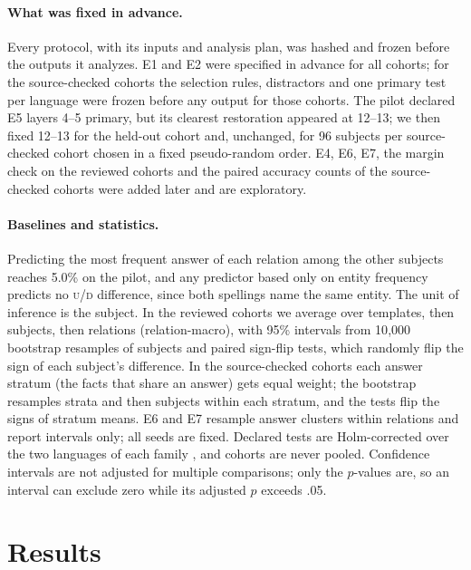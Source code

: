 \documentclass[11pt]{article}
\newcommand{\U}{\textsc{u}}
\newcommand{\D}{\textsc{d}}
\begin{document}
\paragraph{What was fixed in advance.}
Every protocol, with its inputs and analysis plan, was hashed and frozen before
the outputs it analyzes. E1 and E2 were specified in advance for all cohorts; for
the source-checked cohorts the selection rules, distractors and one primary test
per language were frozen before any output for those cohorts. The pilot declared
E5 layers 4--5 primary, but its clearest restoration appeared at 12--13; we then
fixed 12--13 for the held-out cohort and, unchanged, for 96 subjects per
source-checked cohort chosen in a fixed pseudo-random order. E4, E6, E7, the
margin check on the reviewed cohorts and the paired accuracy counts of the
source-checked cohorts were added later and are exploratory.

\paragraph{Baselines and statistics.}
Predicting the most frequent answer of each relation among the other subjects
reaches 5.0\% on the pilot, and any predictor based only on entity frequency
predicts no \U/\D{} difference, since both spellings name the same entity. The unit of inference is the subject. In the reviewed
cohorts we average over templates, then subjects, then relations
(relation-macro), with 95\% intervals from 10{,}000 bootstrap resamples of
subjects \citep{efron-tibshirani-1993-bootstrap,cameron-etal-2008-bootstrap} and
paired sign-flip tests, which randomly flip the sign of each subject's
difference. In the source-checked cohorts each answer stratum (the facts that
share an answer) gets equal weight; the bootstrap resamples strata and then
subjects within each stratum, and the tests flip the signs of stratum means. E6 and E7 resample answer clusters within
relations and report intervals only; all seeds are fixed. Declared tests are
Holm-corrected over the two languages of each family
\citep{holm-1979-simple,dror-etal-2018-hitchhikers}, and cohorts are never
pooled. Confidence intervals are not adjusted for multiple comparisons; only the
$p$-values are, so an interval can exclude zero while its adjusted $p$ exceeds
.05.

\section{Results}
\label{sec:results}
\end{document}
